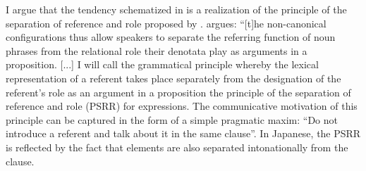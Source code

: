 %

I argue that the tendency schematized in \Last is a realization
of the principle of the separation of reference and role proposed by
.
 argues:
``[t]he non-canonical configurations thus allow speakers to separate the {\sc referring} function of noun phrases from the {\sc relational} role their denotata play as arguments in a proposition. [...]
I will call the grammatical principle whereby the lexical representation of a  referent takes place separately from the designation of the referent's role as an argument in a proposition the {\sc principle of the separation of reference and role} (PSRR) for  expressions. The communicative motivation of this principle can be captured in the form of a simple pragmatic maxim:
``Do not introduce a referent and talk about it in the same clause''.
In Japanese,
the PSRR is reflected by the fact that
 elements are also separated intonationally from the clause.


